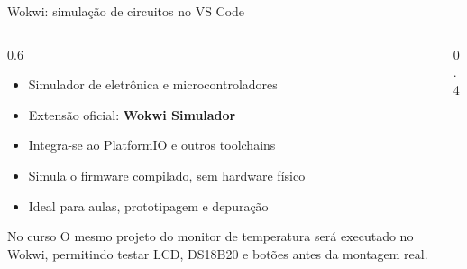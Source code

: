 \documentclass[aspectratio=169]{beamer}
\begin{document}
\begin{frame}{Wokwi: simulação de circuitos no VS Code}
    \begin{columns}
        \begin{column}{0.6\textwidth}
            \begin{itemize}
                \item Simulador de eletrônica e microcontroladores
                \item Extensão oficial: \textbf{Wokwi Simulador}
                \item Integra-se ao PlatformIO e outros toolchains
                \item Simula o firmware compilado, sem hardware físico
                \item Ideal para aulas, prototipagem e depuração
            \end{itemize}
            \vfill
            \begin{block}{No curso}
                O mesmo projeto do monitor de temperatura será executado no Wokwi, permitindo testar LCD, DS18B20 e botões antes da montagem real.
            \end{block}
            \href{https://docs.wokwi.com/vscode/project-config}{}
        \end{column}
        \begin{column}{0.4\textwidth}
            \centering
        \end{column}
    \end{columns}
\end{frame}
\end{document}
